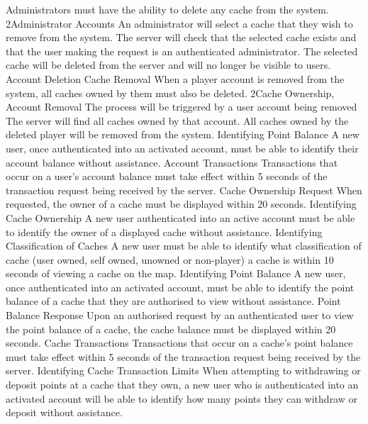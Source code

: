 			{Administrators must have the ability to delete any cache from the
			system.}
			{2}{Administrator Accounts}
			{An administrator will select a cache that they wish to remove from
			the system.}
			{The server will check that the selected cache exists and that the
			user making the request is an authenticated administrator.}
			{The selected cache will be deleted from the server and will no
			longer be visible to users.}
		\funcreq
			{Account Deletion Cache Removal}
			{When a player account is removed from the system, all caches owned
			by them must also be deleted.}
			{2}{Cache Ownership, Account Removal}
			{The process will be triggered by a user account being removed}
			{The server will find all caches owned by that account.}
			{All caches owned by the deleted player will be removed from the
			system.}
		\nonfuncreq
			{Identifying Point Balance}
			{A new user, once authenticated into an activated account, must be
			able to identify their account balance without assistance.}
		\nonfuncreq
			{Account Transactions}
			{Transactions that occur on a user's account balance must take
			effect within 5 seconds of the transaction request being received
			by the server.}
		\nonfuncreq
			{Cache Ownership Request}
			{When requested, the owner of a cache must be displayed within 20
			seconds.}
		\nonfuncreq
			{Identifying Cache Ownership}
			{A new user authenticated into an active account must be able to
			identify the owner of a displayed cache without assistance.}
		\nonfuncreq
			{Identifying Classification of Caches}
			{A new user must be able to identify what classification of cache
			(user owned, self owned, unowned or non-player) a cache is within
			10 seconds of viewing a cache on the map.}
		\nonfuncreq
			{Identifying Point Balance}
			{A new user, once authenticated into an activated account, must be
			able to identify the point balance of a cache that they are
			authorised to view without assistance.}
		\nonfuncreq
			{Point Balance Response}
			{Upon an authorised request by an authenticated user to view the
			point balance of a cache, the cache balance must be displayed
			within 20 seconds.}
		\nonfuncreq
			{Cache Transactions}
			{Transactions that occur on a cache's point balance must take
			effect within 5 seconds of the transaction request being received
			by the server.}
		\nonfuncreq
			{Identifying Cache Transaction Limits}
			{When attempting to withdrawing or deposit points at a cache that
			they own, a new user who is authenticated into an activated account
			will be able to identify how many points they can withdraw or
			deposit without assistance.}

